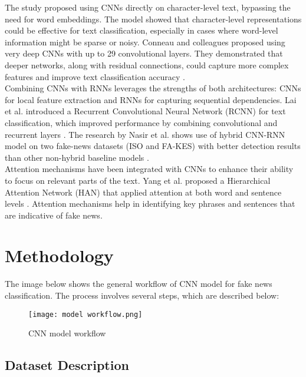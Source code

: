 The study \cite{zhang2016characterlevel} proposed using CNNs directly on character-level text, bypassing the need for word embeddings. The model showed that character-level representations could be effective for text classification, especially in cases where word-level information might be sparse or noisy. Conneau and colleagues proposed using very deep CNNs with up to 29 convolutional layers. They demonstrated that deeper networks, along with residual connections, could capture more complex features and improve text classification accuracy \cite{conneau2017deep}.\\

Combining CNNs with RNNs leverages the strengths of both architectures: CNNs for local feature extraction and RNNs for capturing sequential dependencies. Lai et al. introduced a Recurrent Convolutional Neural Network (RCNN) for text classification, which improved performance by combining convolutional and recurrent layers  \cite{Lai2015RecurrentCN}.  The research by Nasir et al. shows use of hybrid CNN-RNN model on two fake-news datasets (ISO and FA-KES) with better detection results than other non-hybrid baseline models \cite{hybrid-cnn-rnn}.\\

Attention mechanisms have been integrated with CNNs to enhance their ability to focus on relevant parts of the text. Yang et al. proposed a Hierarchical Attention Network (HAN) that applied attention at both word and sentence levels  \cite{yang-etal-2016-hierarchical}.  Attention mechanisms help in identifying key phrases and sentences that are indicative of fake news. \\

\clearpage
\section{Methodology}

The image below shows the general workflow of CNN model for fake news classification. The process involves several steps, which are described below:

\begin{figure}[h]
    \centering
    \texttt{[image: model workflow.png]}
    \caption{CNN model workflow}
    \label{fig:cnn workflow}
\end{figure}

\clearpage
\subsection{Dataset Description}

